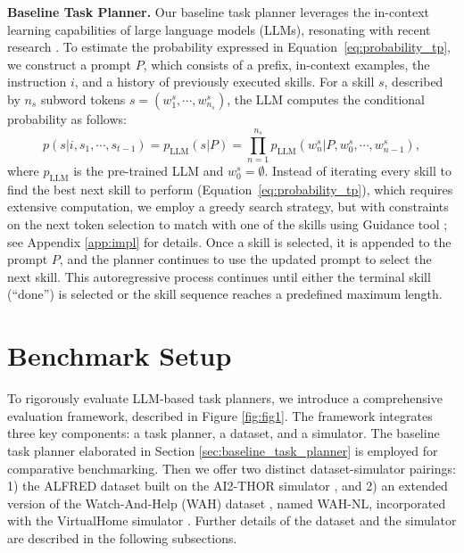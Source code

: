 \textbf{Baseline Task Planner.} Our baseline task planner leverages the in-context learning capabilities of large language models (LLMs), resonating with recent research \citep{huang2022language, liang2023code, ahn2023do}. To estimate the probability expressed in Equation~\ref{eq:probability_tp}, we construct a prompt $P$, which consists of a prefix, in-context examples, the instruction $i$, and a history of previously executed skills. For a skill $s$, described by $n_s$ subword tokens $s = (w^s_1, \cdots, w^s_{n_s})$, the LLM computes the conditional probability as follows:
\begin{equation}
\label{eq:probability_llm}
p(s | i, s_1, \cdots, s_{t-1}) = p_{\text{LLM}}(s | P) = \prod_{n=1}^{n_s} p_{\text{LLM}}(w_{n}^{s} | P, w_{0}^{s}, \cdots, w_{n-1}^{s}),
\end{equation}
where $p_{\text{LLM}}$ is the pre-trained LLM and $w_{0}^{s} = \emptyset$. Instead of iterating every skill to find the best next skill to perform (Equation~\ref{eq:probability_tp}), which requires extensive computation, we employ a greedy search strategy, but with constraints on the next token selection to match with one of the skills using Guidance tool \citep{guidance}; see Appendix \ref{app:impl} for details. Once a skill is selected, it is appended to the prompt $P$, and the planner continues to use the updated prompt to select the next skill. This autoregressive process continues until either the terminal skill (``done'') is selected or the skill sequence reaches a predefined maximum length.

\section{Benchmark Setup}
\label{sec:benchmark}
To rigorously evaluate LLM-based task planners, we introduce a comprehensive evaluation framework, described in Figure \ref{fig:fig1}. The framework integrates three key components: a task planner, a dataset, and a simulator. The baseline task planner elaborated in Section \ref{sec:baseline_task_planner} is employed for comparative benchmarking. Then we offer two distinct dataset-simulator pairings: 1) the ALFRED dataset \citep{shridhar2020alfred} built on the AI2-THOR simulator \citep{kolve2017ai2}, and 2) an extended version of the Watch-And-Help (WAH) dataset \citep{puig2021watchandhelp}, named WAH-NL, incorporated with the VirtualHome simulator \citep{puig2018virtualhome}. %
Further details of the dataset and the simulator are described in the following subsections.

